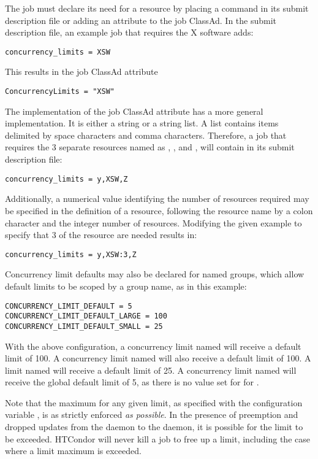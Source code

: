 The job must declare its need for a resource by placing a command
in its submit description file or adding an attribute to the
job ClassAd.
In the submit description file, an example job that requires
the X software adds:
\begin{verbatim}
concurrency_limits = XSW
\end{verbatim}
This results in the job ClassAd attribute
\begin{verbatim}
ConcurrencyLimits = "XSW"
\end{verbatim}

The implementation of the job ClassAd attribute 
has a more general implementation.
It is either a string or a string list.
A list contains items delimited by space characters and comma characters.
Therefore, a job that requires the 3 separate resources 
named as  , , and  , 
will contain in its submit description file:
\begin{verbatim}
concurrency_limits = y,XSW,Z
\end{verbatim}

Additionally, a numerical value identifying the number of resources
required may be specified in the definition of a resource,
following the resource name by a colon character and the integer
number of resources.
Modifying the given example to specify that 3 of 
the  resource are needed results in: 
\begin{verbatim}
concurrency_limits = y,XSW:3,Z
\end{verbatim}

Concurrency limit defaults may also be declared for named groups, which
allow default limits to be scoped by a group name, as in this example:
\begin{verbatim}
CONCURRENCY_LIMIT_DEFAULT = 5
CONCURRENCY_LIMIT_DEFAULT_LARGE = 100
CONCURRENCY_LIMIT_DEFAULT_SMALL = 25
\end{verbatim}

With the above configuration, a concurrency limit named 
 will receive a default limit of 100.  
A concurrency limit named  will also 
receive a default limit of 100.  
A limit named  will receive a default limit of 25.
A concurrency limit named  will receive the 
global default limit of 5, as there is
no value set for  for .

Note that the maximum for any given limit,
as specified with the configuration variable ,
is as strictly enforced \emph{as possible}.
In the presence of preemption and dropped updates from
the  daemon to the  daemon,
it is possible for the limit to be exceeded.
HTCondor will never kill a job to free up a limit,
including the case where a limit maximum is exceeded. 
